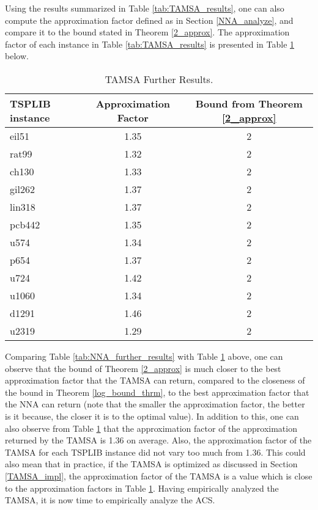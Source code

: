 \documentclass{article}
\begin{document}
Using the results summarized in Table \ref{tab:TAMSA_results}, one can also compute the approximation factor defined as in Section \ref{NNA_analyze}, and compare it to the bound stated in Theorem \ref{2_approx}. The approximation factor of each instance in Table \ref{tab:TAMSA_results} is presented in Table \ref{tab:Tamsa_further} below.
\begin{table}[H]
    \caption{TAMSA Further Results.}
    \label{tab:Tamsa_further}
    \begin{tabular}{l|c|c} %
      \textbf{TSPLIB instance} & \textbf{Approximation Factor} & \textbf{Bound from Theorem \ref{2_approx}}\\
      \hline
    eil51 & 1.35 & 2\\
    rat99 & 1.32  & 2\\
    ch130 & 1.33 & 2  \\
    gil262 & 1.37 & 2  \\
    lin318 & 1.37   &  2  \\
    pcb442 & 1.35 & 2 \\
    u574 & 1.34  & 2 \\ 
    p654 & 1.37 & 2 \\
    u724 & 1.42 & 2 \\
    u1060 & 1.34 & 2  \\
    d1291 & 1.46 & 2\\
    u2319& 1.29 & 2
    \end{tabular}
\end{table}
Comparing Table \ref{tab:NNA_further_results} with Table \ref{tab:Tamsa_further} above, one can observe that the bound of Theorem \ref{2_approx} is much closer to the best approximation factor that the TAMSA can return, compared to the closeness of the bound in Theorem \ref{log_bound_thrm}, to the best approximation factor that the NNA can return (note that the smaller the approximation factor, the better is it because, the closer it is to the optimal value). In addition to this, one can also observe from Table \ref{tab:Tamsa_further} that the approximation factor of the approximation returned by the TAMSA is 1.36 on average. Also, the approximation factor of the TAMSA for each TSPLIB instance did not vary too much from 1.36. This could also mean that in practice, if the TAMSA is optimized as discussed in Section \ref{TAMSA_impl}, the approximation factor of the TAMSA is a value which is close to the approximation factors in Table \ref{tab:Tamsa_further}. Having empirically analyzed the TAMSA, it is now time to empirically analyze the ACS.
\end{document}
